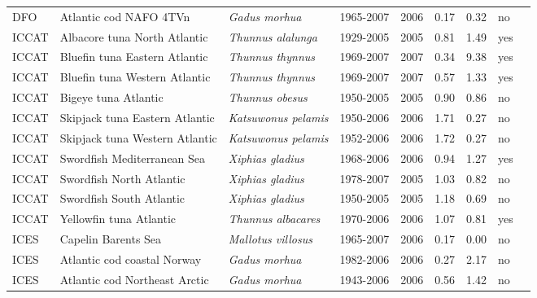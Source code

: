 \begin{longtable}{p{1.8cm}p{4cm}p{4cm}ccccp{1.9cm}c}
  DFO & Atlantic cod NAFO 4TVn & \textit{Gadus morhua} & 1965-2007 & 2006 & 0.17 & 0.32 & no & \cite{DFO-SG-COD4TVn-1965-2007-PREFONTAINE} \\ 
  ICCAT & Albacore tuna North Atlantic & \textit{Thunnus alalunga} & 1929-2005 & 2005 & 0.81 & 1.49 & yes & \cite{ICCAT-ALBANATL-1929-2005-WORM} \\ 
  ICCAT & Bluefin tuna Eastern Atlantic & \textit{Thunnus thynnus} & 1969-2007 & 2007 & 0.34 & 9.38 & yes & \cite{ICCAT-ATBTUNAEATL-1969-2007-WORM} \\ 
  ICCAT & Bluefin tuna Western Atlantic & \textit{Thunnus thynnus} & 1969-2007 & 2007 & 0.57 & 1.33 & yes & \cite{ICCAT-ATBTUNAWATL-1969-2007-WORM} \\ 
  ICCAT & Bigeye tuna Atlantic & \textit{Thunnus obesus} & 1950-2005 & 2005 & 0.90 & 0.86 & no & \cite{ICCAT-BIGEYEATL-1950-2005-JENSEN} \\ 
  ICCAT & Skipjack tuna Eastern Atlantic & \textit{Katsuwonus pelamis} & 1950-2006 & 2006 & 1.71 & 0.27 & no & \cite{ICCAT-SKJEATL-1950-2006-JENSEN} \\ 
  ICCAT & Skipjack tuna Western Atlantic & \textit{Katsuwonus pelamis} & 1952-2006 & 2006 & 1.72 & 0.27 & no & \cite{ICCAT-SKJWATL-1952-2006-JENSEN} \\ 
  ICCAT & Swordfish Mediterranean Sea & \textit{Xiphias gladius} & 1968-2006 & 2006 & 0.94 & 1.27 & yes & \cite{ICCAT-SWORDMED-1968-2006-JENSEN} \\ 
  ICCAT & Swordfish North Atlantic & \textit{Xiphias gladius} & 1978-2007 & 2005 & 1.03 & 0.82 & no & \cite{ICCAT-SWORDNATL-1978-2007-JENSEN} \\ 
  ICCAT & Swordfish South Atlantic & \textit{Xiphias gladius} & 1950-2005 & 2005 & 1.18 & 0.69 & no & \cite{ICCAT-SWORDSATL-1950-2005-JENSEN} \\ 
  ICCAT & Yellowfin tuna Atlantic & \textit{Thunnus albacares} & 1970-2006 & 2006 & 1.07 & 0.81 & yes & \cite{ICCAT-YFINATL-1970-2006-JENSEN} \\ 
  ICES & Capelin Barents Sea & \textit{Mallotus villosus} & 1965-2007 & 2006 & 0.17 & 0.00 & no & \cite{AFWG-CAPENOR-1965-2007-MINTO} \\ 
  ICES & Atlantic cod coastal Norway & \textit{Gadus morhua} & 1982-2006 & 2006 & 0.27 & 2.17 & no & \cite{AFWG-CODCOASTNOR-1982-2006-MINTO} \\ 
  ICES & Atlantic cod Northeast Arctic & \textit{Gadus morhua} & 1943-2006 & 2006 & 0.56 & 1.42 & no & \cite{AFWG-CODNEAR-1943-2006-MINTO} \\ 

\end{longtable}

